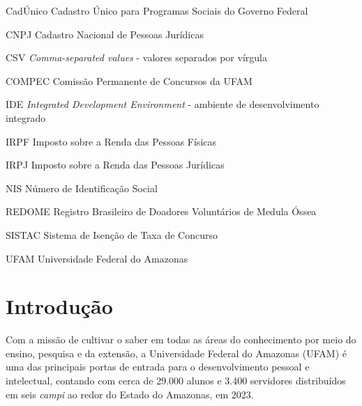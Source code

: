 \documentclass[
	12pt,			%
	openright,		%
	oneside,	
	a4paper,		%
	english,		%
	brazil			%
]{abntex2/abntex2}  %
\begin{document}
	\listoffigures*
	\cleardoublepage

	\listoftables*
	\cleardoublepage

	\begin{siglas}

		\item[CadÚnico] Cadastro Único para Programas Sociais do Governo Federal
		\item[CNPJ] Cadastro Nacional de Pessoas Jurídicas
		\item[CSV] \textit{Comma-separated values} - valores separados por vírgula
		\item[COMPEC] Comissão Permanente de Concursos da UFAM
		\item[IDE] \textit{Integrated Development Environment} - ambiente de desenvolvimento integrado
		\item[IRPF] Imposto sobre a Renda das Pessoas Físicas
		\item[IRPJ] Imposto sobre a Renda das Pessoas Jurídicas
		\item[NIS] Número de Identificação Social
		\item[REDOME] Registro Brasileiro de Doadores Voluntários de Medula Óssea
		\item[SISTAC] Sistema de Isenção de Taxa de Concurso
		\item[UFAM] Universidade Federal do Amazonas

	\end{siglas}

	\tableofcontents*
	\cleardoublepage

	\textual

	\chapter{Introdução}
	
		Com a missão de cultivar o saber em todas as áreas do conhecimento por meio do ensino, pesquisa e da extensão, a Universidade Federal do Amazonas (UFAM) é uma das principais portas de entrada para o desenvolvimento pessoal e intelectual, contando com cerca de 29.000 alunos e 3.400 servidores distribuídos em seis \textit{campi} ao redor do Estado do Amazonas, em 2023.
		
\end{document}
